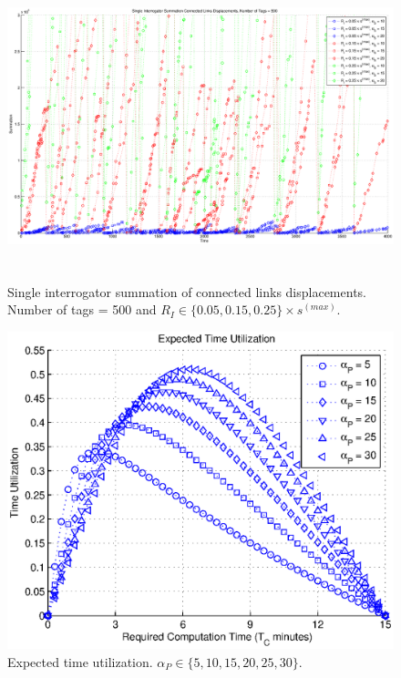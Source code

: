 \begin{figure}
\centering
\includegraphics[width=5in, height=3.5in]{Chapter_4_Figures/sin_disp_500tags_all.eps}
\caption{Single interrogator summation of connected links displacements. Number of tags = 500 and $R_I \in \{0.05, 0.15, 0.25\} \times s^{(max)}$.}
\label{Figure: sin_disp_500tags_all.eps}
\end{figure}
\begin{figure}
\centering
\includegraphics[width=5in]{Chapter_4_Figures/expect_time_util.eps}
\caption{Expected time utilization. $\alpha_P \in \{5, 10, 15, 20, 25, 30\}$.}
\label{Figure: expect_time_util.eps}
\end{figure}
\clearpage

